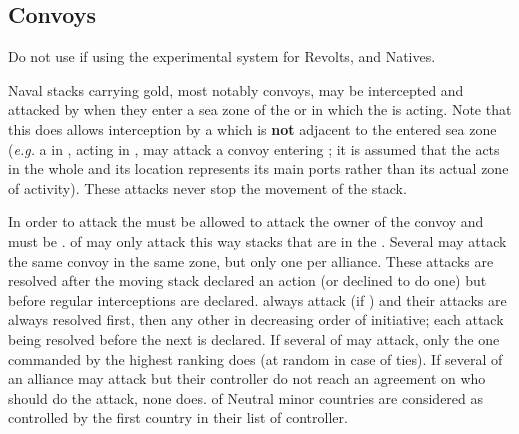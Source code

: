 \subsection{Convoys}
\label{chMilitary:Convoys}
\begin{designnote}
  Do not use if using the experimental system for Revolts, \corsaire and
  Natives.
\end{designnote}

Naval stacks carrying gold, most notably convoys, may be intercepted and
attacked by \corsaire when they enter a sea zone of the \STZ or \CTZ in which
the \corsaire is acting. Note that this does allows interception by a
\corsaire which is \textbf{not} adjacent to the entered sea zone (\emph{e.g.}
a \corsaire in , acting in , may
attack a convoy entering \seazoneMexique; it is assumed that the \corsaire
acts in the whole \STZ and its location represents its main ports rather than
its actual zone of activity). These attacks never stop the movement of the
stack.

In order to attack the \corsaire must be allowed to attack the owner of the
convoy and must be \Faceplus. \corsaire of \Barbaresques may only attack this
way stacks that are in the . Several \corsaire may attack
the same convoy in the same zone, but only one per alliance. These attacks are
resolved after the moving stack declared an action (or declined to do one) but
before regular interceptions are declared.  \corsaire always
attack (if \Faceplus) and their attacks are always resolved first, then any
other in decreasing order of initiative; each attack being resolved before the
next is declared. If several \corsaire of  may attack, only the
one commanded by the highest ranking \LeaderA does (at random in case of
ties). If several \corsaire of an alliance may attack but their controller do
not reach an agreement on who should do the attack, none does. \corsaire of
Neutral minor countries are considered as controlled by the first country in
their list of controller.

